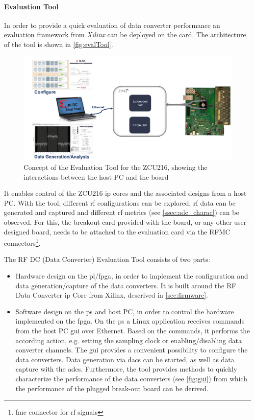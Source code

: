 \paragraph{Evaluation Tool}
In order to provide a quick evaluation of data converter performance an evaluation framework from \textit{Xilinx} can be deployed on the card. 
The architecture of the tool is shown in \autoref{fig:evalTool}. \cite{zcu216evaltool}

\begin{figure}[H]
	\centering
	\includegraphics[width = \textwidth]{chap/05-readout/img/zcu216evaltool}
	\caption[ZCU216 Evaluation Tool]{Concept of the Evaluation Tool for the ZCU216, showing the interactions between the host PC and the board \cite{zcu216evaltool}}
	\label{fig:evalTool}
\end{figure}

It enables control of the ZCU216 \gls{ip} cores and the associated designs from a host PC. 
With the tool, different \gls{rf} configurations can be explored, \gls{rf} data can be generated and captured and different \gls{rf} metrics (see \autoref{ssec:adc_charac}) can be observed.  \cite{zcu216evaltool}
For this, the breakout card provided with the board, or any other user-designed board, needs to be attached to the evaluation card via the RFMC connectors\footnote{\gls{fmc} connector for \gls{rf} signals}.

The RF DC (Data Converter) Evaluation Tool consists of two parts:
\begin{itemize}
	\item Hardware design on the \gls{pl}/\gls{fpga}, in order to implement the configuration and data generation/capture of the data converters.
	It is built around the RF Data Converter \gls{ip} Core from Xilinx, descrived in \autoref{sec:firmware}.
	\item Software design on the \gls{ps} and host PC, in order to control the hardware implemented on the \gls{fpga}.
	On the \gls{ps} a Linux application receives commands from the host PC \gls{gui} over Ethernet.
	Based on the commands, it performs the according action, e.g. setting the sampling clock or enabling/disabling data converter channels.
	The \gls{gui} provides a convenient possibility to configure the data converters.
	Data generation via \glspl{dac} can be started, as well as data capture with the \glspl{adc}.
	Furthermore, the tool provides methods to quickly characterize the performance of the data converters (see \autoref{fig:gui}) from which the performance of the plugged break-out board can be derived.
\end{itemize}


